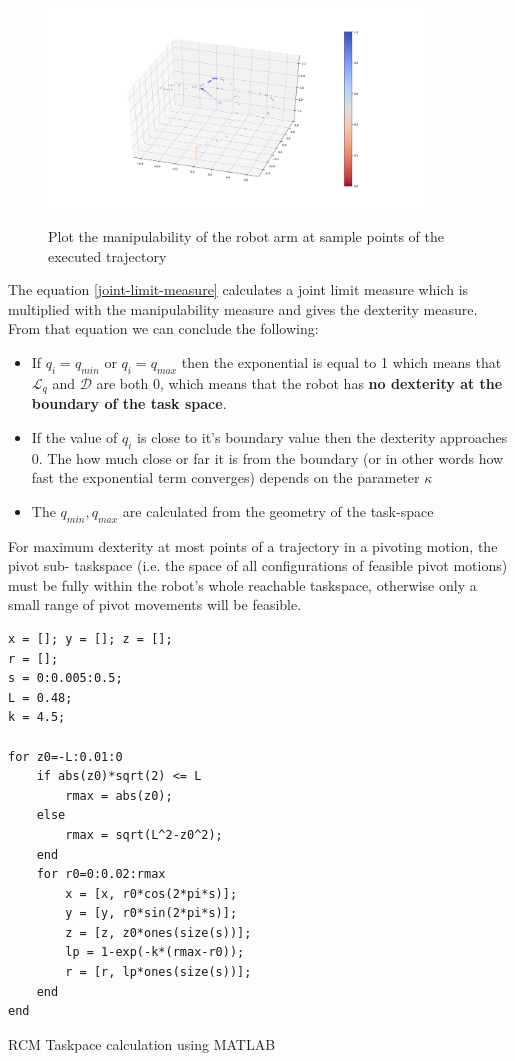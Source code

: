 \begin{center}
\begin{figure}[H]
\centering
\includegraphics[width=10cm]{images/robot-planner1-manipulability-plot.png}\\
\caption{Plot the manipulability of the robot arm at sample points of the executed trajectory}
\end{figure}
\end{center}

The equation \ref{joint-limit-measure} calculates a joint limit measure which is multiplied with the manipulability measure and gives the dexterity measure.
From that equation we can conclude the following:
\begin{itemize}
\item If $q_i = q_{min}$ or $q_i = q_{max}$ then the exponential is equal to 1 which means that $\mathcal{L}_{q}$ and $\mathcal{D}$ are both 0, which means 
that the robot has \textbf{no dexterity at the boundary of the task space}.
\item If the value of $q_i$ is close to it's boundary value then the dexterity approaches 0. The how much close or far it is from the boundary (or in other words 
how fast the exponential term converges) depends on the parameter $\kappa$
\item The $q_{min}, q_{max}$ are calculated from the geometry of the task-space
\end{itemize}

For maximum dexterity at most points of a trajectory in a pivoting motion, the pivot sub-
taskspace (i.e. the space of all configurations of feasible pivot motions) must be fully within 
the robot’s whole reachable taskspace, otherwise only a small range of pivot movements will be 
feasible.

\begin{listing}[H]
\begin{verbatim}
x = []; y = []; z = [];
r = [];
s = 0:0.005:0.5;
L = 0.48;
k = 4.5;

for z0=-L:0.01:0
    if abs(z0)*sqrt(2) <= L
        rmax = abs(z0);
    else
        rmax = sqrt(L^2-z0^2);
    end
    for r0=0:0.02:rmax
        x = [x, r0*cos(2*pi*s)];
        y = [y, r0*sin(2*pi*s)];
        z = [z, z0*ones(size(s))];
        lp = 1-exp(-k*(rmax-r0));
        r = [r, lp*ones(size(s))];
    end
end
\end{verbatim}
\caption{RCM Taskpace calculation using MATLAB}
\label{code:rcm_taskspace_matlab}
\end{listing}

